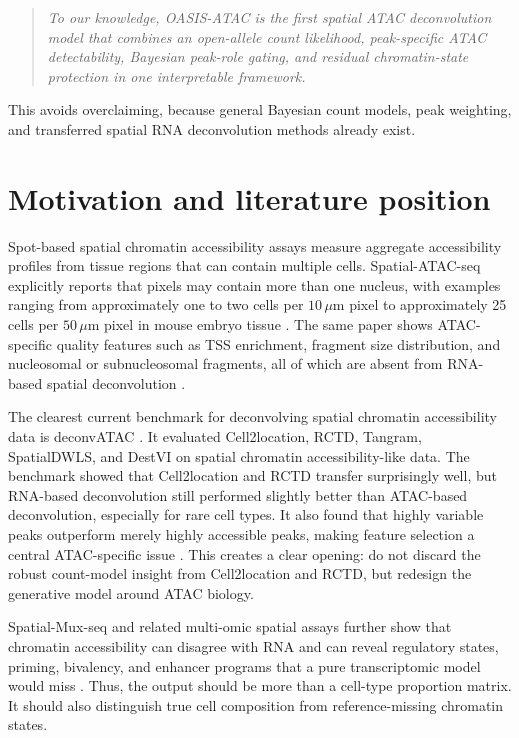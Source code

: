 \documentclass[11pt]{article}
\begin{document}
\begin{quote}
\textit{To our knowledge, OASIS-ATAC is the first spatial ATAC deconvolution model that combines an open-allele count likelihood, peak-specific ATAC detectability, Bayesian peak-role gating, and residual chromatin-state protection in one interpretable framework.}
\end{quote}

This avoids overclaiming, because general Bayesian count models, peak weighting, and transferred spatial RNA deconvolution methods already exist.

\section{Motivation and literature position}

Spot-based spatial chromatin accessibility assays measure aggregate accessibility profiles from tissue regions that can contain multiple cells. Spatial-ATAC-seq explicitly reports that pixels may contain more than one nucleus, with examples ranging from approximately one to two cells per $10\,\mu$m pixel to approximately 25 cells per $50\,\mu$m pixel in mouse embryo tissue \cite{deng2022spatialatac}. The same paper shows ATAC-specific quality features such as TSS enrichment, fragment size distribution, and nucleosomal or subnucleosomal fragments, all of which are absent from RNA-based spatial deconvolution \cite{deng2022spatialatac}.

The clearest current benchmark for deconvolving spatial chromatin accessibility data is deconvATAC \cite{ouologuem2025deconvatac}. It evaluated Cell2location, RCTD, Tangram, SpatialDWLS, and DestVI on spatial chromatin accessibility-like data. The benchmark showed that Cell2location and RCTD transfer surprisingly well, but RNA-based deconvolution still performed slightly better than ATAC-based deconvolution, especially for rare cell types. It also found that highly variable peaks outperform merely highly accessible peaks, making feature selection a central ATAC-specific issue \cite{ouologuem2025deconvatac}. This creates a clear opening: do not discard the robust count-model insight from Cell2location and RCTD, but redesign the generative model around ATAC biology.

Spatial-Mux-seq and related multi-omic spatial assays further show that chromatin accessibility can disagree with RNA and can reveal regulatory states, priming, bivalency, and enhancer programs that a pure transcriptomic model would miss \cite{guo2025spatialmux}. Thus, the output should be more than a cell-type proportion matrix. It should also distinguish true cell composition from reference-missing chromatin states.
\end{document}

